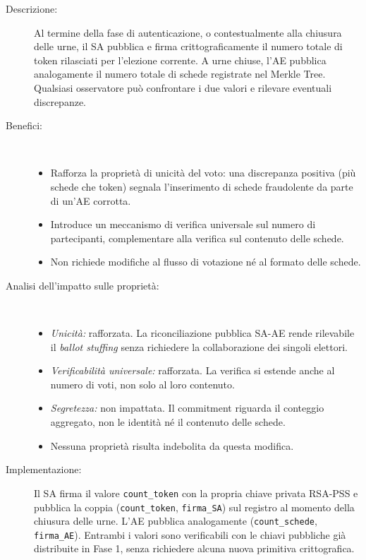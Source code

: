 \documentclass[12pt,a4paper]{article}
\begin{document}
\begin{description}
  \item[Descrizione:] Al termine della fase di autenticazione, o contestualmente alla chiusura delle urne, il SA pubblica e firma crittograficamente il numero totale di token rilasciati per l'elezione corrente. A urne chiuse, l'AE pubblica analogamente il numero totale di schede registrate nel Merkle Tree. Qualsiasi osservatore può confrontare i due valori e rilevare eventuali discrepanze.
  \item[Benefici:] \
    \begin{itemize}
      \item Rafforza la proprietà di unicità del voto: una discrepanza positiva (più schede che token) segnala l'inserimento di schede fraudolente da parte di un'AE corrotta.
      \item Introduce un meccanismo di verifica universale sul numero di partecipanti, complementare alla verifica sul contenuto delle schede.
      \item Non richiede modifiche al flusso di votazione né al formato delle schede.
    \end{itemize}
  \item[Analisi dell'impatto sulle proprietà:] \
    \begin{itemize}
      \item \textit{Unicità:} rafforzata. La riconciliazione pubblica SA-AE rende rilevabile il \textit{ballot stuffing} senza richiedere la collaborazione dei singoli elettori.
      \item \textit{Verificabilità universale:} rafforzata. La verifica si estende anche al numero di voti, non solo al loro contenuto.
      \item \textit{Segretezza:} non impattata. Il commitment riguarda il conteggio aggregato, non le identità né il contenuto delle schede.
      \item Nessuna proprietà risulta indebolita da questa modifica.
    \end{itemize}
  \item[Implementazione:] Il SA firma il valore \texttt{count\_token} con la propria chiave privata RSA-PSS e pubblica la coppia (\texttt{count\_token}, \texttt{firma\_SA}) sul registro al momento della chiusura delle urne. L'AE pubblica analogamente (\texttt{count\_schede}, \texttt{firma\_AE}). Entrambi i valori sono verificabili con le chiavi pubbliche già distribuite in Fase 1, senza richiedere alcuna nuova primitiva crittografica.
\end{description}
\end{document}
